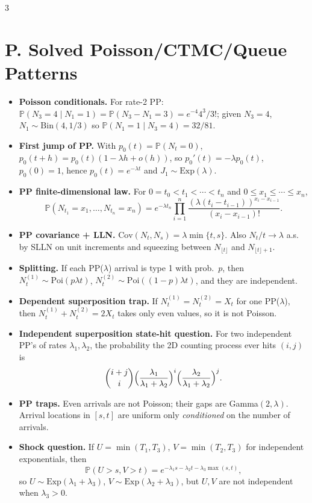 \documentclass[8pt]{extarticle}
\newcommand{\PP}{\mathbb{P}}
\newcommand{\1}{\mathbf{1}}
\begin{document}
\begin{multicols*}{3}
\section*{P. Solved Poisson/CTMC/Queue Patterns}
\begin{itemize}
\item \textbf{Poisson conditionals.} For rate-2 PP: $\PP(N_3=4\mid N_1=1)=\PP(N_3-N_1=3)=e^{-4}4^3/3!$; given $N_3=4$, $N_1\sim\mathrm{Bin}(4,1/3)$ so $\PP(N_1=1\mid N_3=4)=32/81$.
\item \textbf{First jump of PP.} With $p_0(t)=\PP(N_t=0)$, $p_0(t+h)=p_0(t)(1-\lambda h+o(h))$, so $p_0'(t)=-\lambda p_0(t)$, $p_0(0)=1$, hence $p_0(t)=e^{-\lambda t}$ and $J_1\sim\mathrm{Exp}(\lambda)$.
\item \textbf{PP finite-dimensional law.} For $0=t_0<t_1<\cdots<t_n$ and $0\le x_1\le\cdots\le x_n$,
\[
\PP(N_{t_1}=x_1,\dots,N_{t_n}=x_n)=e^{-\lambda t_n}\prod_{i=1}^n
\frac{(\lambda(t_i-t_{i-1}))^{x_i-x_{i-1}}}{(x_i-x_{i-1})!}.
\]
\item \textbf{PP covariance + LLN.} $\mathrm{Cov}(N_t,N_s)=\lambda\min\{t,s\}$. Also $N_t/t\to\lambda$ a.s. by SLLN on unit increments and squeezing between $N_{\lfloor t\rfloor}$ and $N_{\lfloor t\rfloor+1}$.
\item \textbf{Splitting.} If each PP($\lambda$) arrival is type 1 with prob.\ $p$, then $N^{(1)}_t\sim\mathrm{Poi}(p\lambda t)$, $N^{(2)}_t\sim\mathrm{Poi}((1-p)\lambda t)$, and they are independent.
\item \textbf{Dependent superposition trap.} If $N_t^{(1)}=N_t^{(2)}=X_t$ for one PP($\lambda$), then $N_t^{(1)}+N_t^{(2)}=2X_t$ takes only even values, so it is not Poisson.
\item \textbf{Independent superposition state-hit question.} For two independent PP's of rates $\lambda_1,\lambda_2$, the probability the 2D counting process ever hits $(i,j)$ is
\[
\binom{i+j}{i}\Bigl(\frac{\lambda_1}{\lambda_1+\lambda_2}\Bigr)^i
\Bigl(\frac{\lambda_2}{\lambda_1+\lambda_2}\Bigr)^j.
\]
\item \textbf{PP traps.} Even arrivals are not Poisson; their gaps are Gamma$(2,\lambda)$. Arrival locations in $[s,t]$ are uniform only \emph{conditioned} on the number of arrivals.
\item \textbf{Shock question.} If $U=\min(T_1,T_3)$, $V=\min(T_2,T_3)$ for independent exponentials, then
\[
\PP(U>s,V>t)=e^{-\lambda_1 s-\lambda_2 t-\lambda_3\max(s,t)},
\]
so $U\sim\mathrm{Exp}(\lambda_1+\lambda_3)$, $V\sim\mathrm{Exp}(\lambda_2+\lambda_3)$, but $U,V$ are not independent when $\lambda_3>0$.

\end{itemize}
\end{multicols*}
\end{document}
